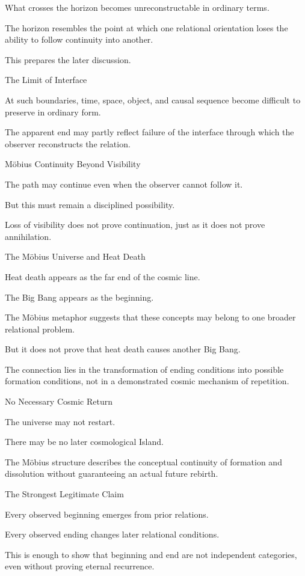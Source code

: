 What crosses the horizon becomes unreconstructable in ordinary terms.

The horizon resembles the point at which one relational orientation loses the ability to follow continuity into another.

This prepares the later discussion.

The Limit of Interface

At such boundaries, time, space, object, and causal sequence become difficult to preserve in ordinary form.

The apparent end may partly reflect failure of the interface through which the observer reconstructs the relation.

Möbius Continuity Beyond Visibility

The path may continue even when the observer cannot follow it.

But this must remain a disciplined possibility.

Loss of visibility does not prove continuation, just as it does not prove annihilation.

The Möbius Universe and Heat Death

Heat death appears as the far end of the cosmic line.

The Big Bang appears as the beginning.

The Möbius metaphor suggests that these concepts may belong to one broader relational problem.

But it does not prove that heat death causes another Big Bang.

The connection lies in the transformation of ending conditions into possible formation conditions, not in a demonstrated cosmic mechanism of repetition.

No Necessary Cosmic Return

The universe may not restart.

There may be no later cosmological Island.

The Möbius structure describes the conceptual continuity of formation and dissolution without guaranteeing an actual future rebirth.

The Strongest Legitimate Claim

Every observed beginning emerges from prior relations.

Every observed ending changes later relational conditions.

This is enough to show that beginning and end are not independent categories, even without proving eternal recurrence.


